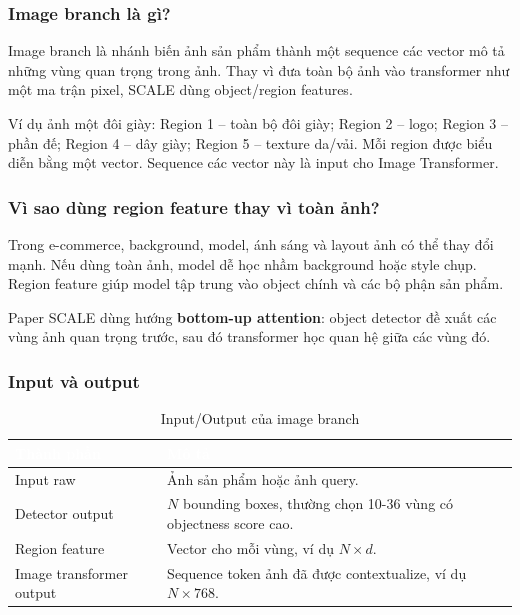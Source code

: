 \documentclass[12pt,a4paper]{article}
\begin{document}
\subsubsection{Image branch là gì?}
Image branch là nhánh biến ảnh sản phẩm thành một sequence các vector mô tả những vùng quan trọng trong ảnh. Thay vì đưa toàn bộ ảnh vào transformer như một ma trận pixel, SCALE dùng object/region features.

Ví dụ ảnh một đôi giày: Region 1 -- toàn bộ đôi giày; Region 2 -- logo; Region 3 -- phần đế; Region 4 -- dây giày; Region 5 -- texture da/vải. Mỗi region được biểu diễn bằng một vector. Sequence các vector này là input cho Image Transformer.

\subsubsection{Vì sao dùng region feature thay vì toàn ảnh?}
Trong e-commerce, background, model, ánh sáng và layout ảnh có thể thay đổi mạnh. Nếu dùng toàn ảnh, model dễ học nhầm background hoặc style chụp. Region feature giúp model tập trung vào object chính và các bộ phận sản phẩm.

Paper SCALE dùng hướng \textbf{bottom-up attention}: object detector đề xuất các vùng ảnh quan trọng trước, sau đó transformer học quan hệ giữa các vùng đó.

\subsubsection{Input và output}
\begin{table}[htbp]
\centering
\begin{tabularx}{\linewidth}{@{}L{3.2cm}Y@{}}
\toprule
{}
\textcolor{white}{\textbf{Thành phần}} & \textcolor{white}{\textbf{Mô tả}} \\
\midrule
Input raw & Ảnh sản phẩm hoặc ảnh query. \\
Detector output & $N$ bounding boxes, thường chọn 10-36 vùng có objectness score cao. \\
Region feature & Vector cho mỗi vùng, ví dụ $N \times d$. \\
Image transformer output & Sequence token ảnh đã được contextualize, ví dụ $N \times 768$. \\
\bottomrule
\end{tabularx}
\caption{Input/Output của image branch}
\end{table}
\end{document}
